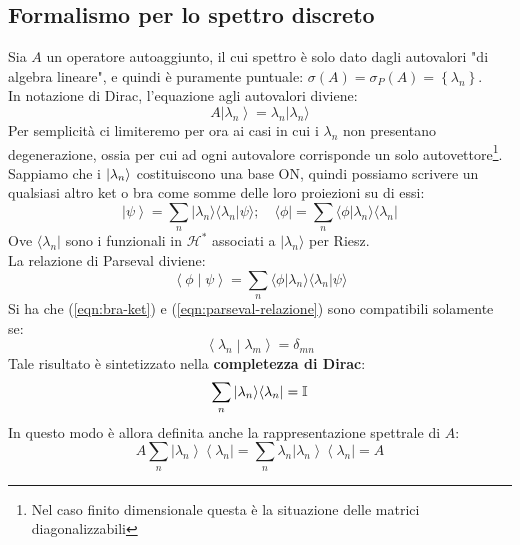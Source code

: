 \documentclass[12pt]{article}
\begin{document}
\subsection{Formalismo per lo spettro discreto}
Sia $A$ un operatore autoaggiunto, il cui spettro è solo dato dagli autovalori "di algebra lineare", e quindi è puramente puntuale: $\sigma \left(A\right)= \sigma_P\left(A\right)= \left\{\lambda_n\right\}$.\\
In notazione di Dirac, l'equazione agli autovalori diviene:
\[
A \left|\lambda_n\right\rangle=\lambda_n|\lambda_n \rangle 
\]
Per semplicità ci limiteremo per ora ai casi in cui i $\lambda_n$ non presentano degenerazione, ossia per cui ad ogni autovalore corrisponde un solo autovettore\footnote{Nel caso finito dimensionale questa è la situazione delle matrici diagonalizzabili}.\\
Sappiamo che i $\ket{\lambda_n}$  costituiscono una base ON, quindi possiamo scrivere un qualsiasi altro ket o bra come somme delle loro proiezioni su di essi:
\begin{equation}
\left|\psi\right\rangle=\sum_{n}{|\lambda_n\rangle \langle\lambda_n|\psi\rangle }; \quad 
\langle \phi |=\sum_{n}{\langle\phi|\lambda_n\rangle \langle\lambda_n|}
\label{eqn:bra-ket}
\end{equation}
Ove $\langle \lambda_n|$ sono i funzionali in $\mathcal{H}^\ast$ associati a $|\lambda_n \rangle$  per Riesz.\\
La relazione di Parseval diviene:
\begin{equation}
\left\langle\phi\middle|\psi\right\rangle=\sum_{n}{\langle\phi|\lambda_n\rangle \langle\lambda_n|\psi\rangle }
\label{eqn:parseval-relazione}
\end{equation}
Si ha che (\ref{eqn:bra-ket}) e (\ref{eqn:parseval-relazione}) sono compatibili solamente se:
\[
\left\langle\lambda_n\middle|\lambda_m\right\rangle=\delta_{mn}
\]
Tale risultato è sintetizzato nella \textbf{completezza di Dirac}:
\[
\sum_{n}{|\lambda_n\rangle \langle\lambda_n|}=\mathbb{I}
\]
In questo modo è allora definita anche la rappresentazione spettrale di $A$:
\[
A\sum_{n}{\left|\lambda_n\right\rangle\left\langle\lambda_n\right|=\sum_{n}{\lambda_n\left|\lambda_n\right\rangle\left\langle\lambda_n\right|=A}}
\]
\end{document}
